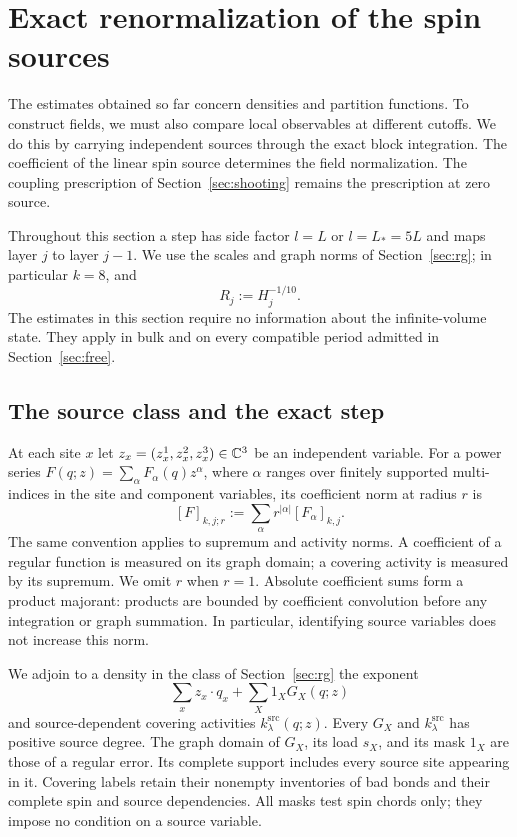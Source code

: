 \section{Exact renormalization of the spin sources}
\label{sec:sources}

The estimates obtained so far concern densities and partition functions.
To construct fields, we must also compare local observables at different
cutoffs.  We do this by carrying independent sources through the exact
block integration.  The coefficient of the linear spin source determines
the field normalization.  The coupling prescription of
Section~\ref{sec:shooting} remains the prescription at zero source.

Throughout this section a step has side factor $l=L$ or $l=L_*=5L$ and
maps layer $j$ to layer $j-1$.  We use the scales and graph norms of
Section~\ref{sec:rg}; in particular $k=8$, and
\[
 R_j:=H_j^{-1/10}.
\]
The estimates in this section require no information about the
infinite-volume state.  They apply in bulk and on every compatible
period admitted in Section~\ref{sec:free}.

\subsection{The source class and the exact step}

At each site $x$ let $z_x=(z_x^1,z_x^2,z_x^3)\in\mathbb C^3$ be an independent
variable.  For a power series $F(q;z)=\sum_\alpha F_\alpha(q)z^\alpha$,
where $\alpha$ ranges over finitely supported multi-indices in the
site and component variables, its coefficient norm at radius $r$ is
\[
 [F]_{k,j;r}:=\sum_\alpha r^{|\alpha|}[F_\alpha]_{k,j}.
\]
The same convention applies to supremum and activity norms.  A
coefficient of a regular function is measured on its graph domain;
a covering activity is measured by its supremum.  We omit $r$ when
$r=1$.  Absolute coefficient sums form a product majorant: products
are bounded by coefficient convolution before any integration or
graph summation.  In particular, identifying source variables does
not increase this norm.

We adjoin to a density in the class of Section~\ref{sec:rg} the
exponent
\[
 \sum_x z_x\cdot q_x+\sum_X 1_XG_X(q;z)
\]
and source-dependent covering activities $k^{\mathrm{src}}_\lambda(q;z)$.
Every $G_X$ and $k^{\mathrm{src}}_\lambda$ has positive source degree.
The graph domain of $G_X$, its load $s_X$, and its mask $1_X$ are those
of a regular error.  Its complete support includes every source site
appearing in it.  Covering labels retain their nonempty inventories of
bad bonds and their complete spin and source dependencies.  All masks
test spin chords only; they impose no condition on a source variable.

